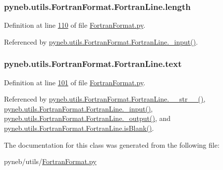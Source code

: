 \hypertarget{classpyneb_1_1utils_1_1_fortran_format_1_1_fortran_line_a4cd0f5ee28f8250f2c6fbbb9ff890e0a}{}
\subsubsection[{length}]{\setlength{\rightskip}{0pt plus 5cm}pyneb.\+utils.\+Fortran\+Format.\+Fortran\+Line.\+length}\label{classpyneb_1_1utils_1_1_fortran_format_1_1_fortran_line_a4cd0f5ee28f8250f2c6fbbb9ff890e0a}


Definition at line \hyperlink{_fortran_format_8py_source_l00110}{110} of file \hyperlink{_fortran_format_8py_source}{Fortran\+Format.\+py}.



Referenced by \hyperlink{_fortran_format_8py_source_l00155}{pyneb.\+utils.\+Fortran\+Format.\+Fortran\+Line.\+\_\+input()}.

\hypertarget{classpyneb_1_1utils_1_1_fortran_format_1_1_fortran_line_a70d4893b8dd8ae61297b1d3e4b8bc612}{}
\subsubsection[{text}]{\setlength{\rightskip}{0pt plus 5cm}pyneb.\+utils.\+Fortran\+Format.\+Fortran\+Line.\+text}\label{classpyneb_1_1utils_1_1_fortran_format_1_1_fortran_line_a70d4893b8dd8ae61297b1d3e4b8bc612}


Definition at line \hyperlink{_fortran_format_8py_source_l00101}{101} of file \hyperlink{_fortran_format_8py_source}{Fortran\+Format.\+py}.



Referenced by \hyperlink{_fortran_format_8py_source_l00141}{pyneb.\+utils.\+Fortran\+Format.\+Fortran\+Line.\+\_\+\+\_\+str\+\_\+\+\_\+()}, \hyperlink{_fortran_format_8py_source_l00155}{pyneb.\+utils.\+Fortran\+Format.\+Fortran\+Line.\+\_\+input()}, \hyperlink{_fortran_format_8py_source_l00195}{pyneb.\+utils.\+Fortran\+Format.\+Fortran\+Line.\+\_\+output()}, and \hyperlink{_fortran_format_8py_source_l00148}{pyneb.\+utils.\+Fortran\+Format.\+Fortran\+Line.\+is\+Blank()}.



The documentation for this class was generated from the following file\+:\begin{DoxyCompactItemize}
\item 
pyneb/utils/\hyperlink{_fortran_format_8py}{Fortran\+Format.\+py}\end{DoxyCompactItemize}
